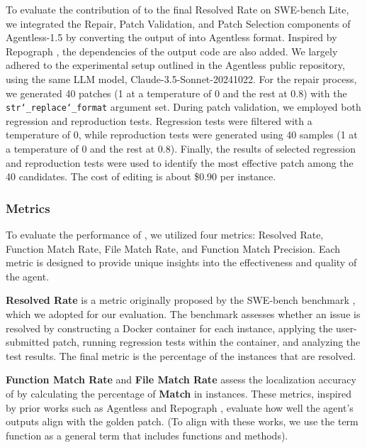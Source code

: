 To evaluate the contribution of \nickname to the final Resolved Rate on SWE-bench Lite, we integrated the Repair, Patch Validation, and Patch Selection components of Agentless-1.5 \cite{xia2024agentless} by converting the output of \nickname into Agentless format. Inspired by Repograph \cite{ouyang2024repograph}, the dependencies of the output code are also added.
We largely adhered to the experimental setup outlined in the Agentless public repository, using the same LLM model, Claude-3.5-Sonnet-20241022. For the repair process, we generated 40 patches (1 at a temperature of 0 and the rest at 0.8) with the \texttt{str\char`_replace\char`_format} argument set. During patch validation, we employed both regression and reproduction tests. Regression tests were filtered with a temperature of 0, while reproduction tests were generated using 40 samples (1 at a temperature of 0 and the rest at 0.8). Finally, the results of selected regression and reproduction tests were used to identify the most effective patch among the 40 candidates.
The cost of editing is about \$0.90 per instance.


\subsubsection{Metrics}
\label{exp:metrics}

To evaluate the performance of \nickname, we utilized four metrics: Resolved Rate, Function Match Rate, File Match Rate, and Function Match Precision. Each metric is designed to provide unique insights into the effectiveness and quality of the agent. 
\squishlist
\item \textbf{Resolved Rate} is a metric originally proposed by the SWE-bench benchmark \cite{swebench}, which we adopted for our evaluation.
The benchmark assesses whether an issue is resolved by constructing a Docker container for each instance, applying the user-submitted patch, running regression tests within the container, and analyzing the test results.
The final metric is the percentage of the instances that are resolved.

\item \textbf{Function Match Rate} and \textbf{File Match Rate} assess the localization accuracy of \nickname by calculating the percentage of \textbf{Match} in instances. These metrics, inspired by prior works such as Agentless \cite{xia2024agentless} and Repograph \cite{ouyang2024repograph}, evaluate how well the agent’s outputs align with the golden patch. (To align with these works, we use the term function as a general term that includes functions and methods).

